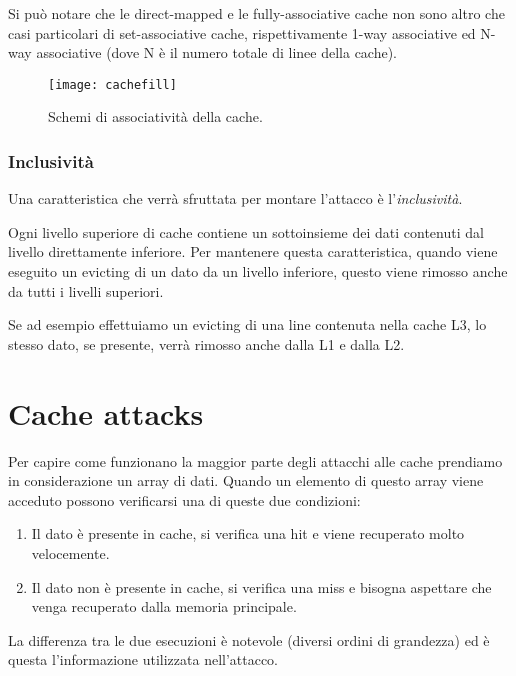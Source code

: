 				Si può notare che le direct-mapped e le fully-associative cache non sono altro che casi particolari di set-associative cache, rispettivamente 1-way associative ed N-way associative (dove N è il numero totale di linee della cache).
				
				\begin{figure}
					\begin{center}
						\texttt{[image: cachefill]}
						\caption{Schemi di associatività della cache.}
						\label{fig:cachefill}
					\end{center}
				\end{figure}
				
			\subsubsection{Inclusività}
				Una caratteristica che verrà sfruttata per montare l'attacco è l'\emph{inclusività}. 
				
				Ogni livello superiore di cache contiene un sottoinsieme dei dati contenuti dal livello direttamente inferiore. Per mantenere questa caratteristica, quando viene eseguito un evicting di un dato da un livello inferiore, questo viene rimosso anche da tutti i livelli superiori.
				
				Se ad esempio effettuiamo un evicting di una line contenuta nella cache L3, lo stesso dato, se presente, verrà rimosso anche dalla L1 e dalla L2.
				
	\section{Cache attacks}
		Per capire come funzionano la maggior parte degli attacchi alle cache prendiamo in considerazione un array di dati. Quando un elemento di questo array viene acceduto possono verificarsi una di queste due condizioni:
		
		\begin{enumerate}
			\item Il dato è presente in cache, si verifica una hit e viene recuperato molto velocemente.
			\item Il dato non è presente in cache, si verifica una miss e bisogna aspettare che venga recuperato dalla memoria principale.
		\end{enumerate}
		
		La differenza tra le due esecuzioni è notevole (diversi ordini di grandezza) ed è questa l'informazione utilizzata nell'attacco.
		
